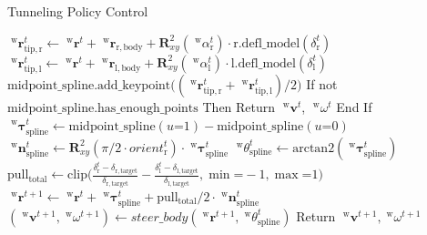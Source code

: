 \begin{algorithm}
    \caption{Tunneling Policy Control}
    \label{alg:tunneling_policy}
    \begin{algorithmic}[1]
        \State \colorbox{yellow!40}{\(\;^{\mathrm{w}}\boldsymbol{r}_{\mathrm{tip, r}}^{t} \gets \;^{\mathrm{w}}\boldsymbol{r}^{t} + \;^{\mathrm{w}}\boldsymbol{r}_{\mathrm{r, body}} + \boldsymbol{R}_{xy}^{2}(\; ^{\mathrm{w}}\alpha_{\mathrm{r}}^{t}) \cdot \mathrm{r.defl\_model}(\delta_{\mathrm{r}}^{t})\)}
        \State \colorbox{yellow!40}{\(\;^{\mathrm{w}}\boldsymbol{r}_{\mathrm{tip, l}}^{t} \gets \;^{\mathrm{w}}\boldsymbol{r}^{t} + \;^{\mathrm{w}}\boldsymbol{r}_{\mathrm{l, body}} + \boldsymbol{R}_{xy}^{2}(\; ^{\mathrm{w}}\alpha_{\mathrm{l}}^{t}) \cdot \mathrm{l.defl\_model}(\delta_{\mathrm{l}}^{t})\)}
        \State \colorbox{yellow!40}{\(\mathrm{midpoint\_spline.add\_keypoint}\big((\;^{\mathrm{w}}\boldsymbol{r}_{\mathrm{tip, r}}^{t} + \;^{\mathrm{w}}\boldsymbol{r}_{\mathrm{tip, l}}^{t}) / 2\big)\)}
        \State If not \(\mathrm{midpoint\_spline.has\_enough\_points}\) Then Return \(\;^{\mathrm{w}}\boldsymbol{v}^{t}\), \(\;^{\mathrm{w}}\omega^{t}\) End If
        \State
        \State \colorbox{cyan!40}{\(\;^{\mathrm{w}}\boldsymbol{\tau}_{\mathrm{spline}}^{t} \gets \mathrm{midpoint\_spline}(u\mathord{=}1) - \mathrm{midpoint\_spline}(u\mathord{=}0)\)}
        \State \colorbox{cyan!40}{\(\;^{\mathrm{w}}\boldsymbol{n}_{\mathrm{spline}}^{t} \gets \boldsymbol{R}_{xy}^{2}(\pi/2 \cdot orient_\mathrm{r}^t)\cdot\;^{\mathrm{w}}\boldsymbol{\tau}_{\mathrm{spline}}^{t}\)}
        \State \colorbox{cyan!40}{\(\;^{\mathrm{w}}\theta_{\mathrm{spline}}^{t} \gets \mathrm{arctan2}(\;^{\mathrm{w}}\boldsymbol{\tau}_{\mathrm{spline}}^{t})\)}
        \State \colorbox{green!40}{\(\mathrm{pull_{total}} \gets \mathrm{clip}\big(\frac{\delta_{\mathrm{r}}^{t} - \delta_{\mathrm{r, target}}}{\delta_{\mathrm{r, target}}} - \frac{\delta_{\mathrm{l}}^{t} - \delta_{\mathrm{l, target}}}{\delta_{\mathrm{l, target}}},\mathrm{\min}\mathord{=}-1, \mathrm{\max}\mathord{=}1\big)\)}
        \State \colorbox{green!40}{\(\;^{\mathrm{w}}\boldsymbol{r}^{t+1} \gets \;^{\mathrm{w}}\boldsymbol{r}^{t} + \;^{\mathrm{w}}\boldsymbol{\tau}_{\mathrm{spline}}^{t} + \mathrm{pull_{total}}/2 \cdot \;^{\mathrm{w}}\boldsymbol{n}_{\mathrm{spline}}^{t}\)}
        \State \((\;^{\mathrm{w}}\boldsymbol{v}^{t+1}, \;^{\mathrm{w}}\omega^{t+1}) \gets steer\_body(\;^{\mathrm{w}}\boldsymbol{r}^{t+1},\;^{\mathrm{w}}\theta_{\mathrm{spline}}^{t})\)
        \State Return \(\;^{\mathrm{w}}\boldsymbol{v}^{t+1}, \;^{\mathrm{w}}\omega^{t+1}\)
    \end{algorithmic}
\end{algorithm}


